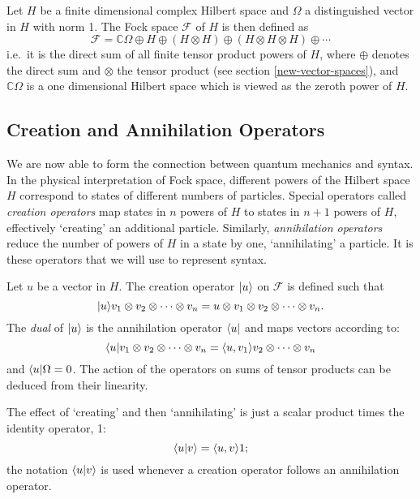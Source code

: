 \documentclass[12pt]{report}
\begin{document}

Let $H$ be a finite dimensional complex Hilbert space and $\Omega$ a distinguished vector in $H$ with norm 1. The Fock space $\mathcal{F}$ of $H$ is then defined as
$$\mathcal{F} = \mathbb{C}\Omega \oplus H \oplus (H \otimes H) \oplus (H \otimes H \otimes H) \oplus \cdots$$
i.e.~it is the direct sum of all finite tensor product powers of $H$, where $\oplus$ denotes the direct sum and $\otimes$ the tensor product (see section \ref{new-vector-spaces}), and $\mathbb{C}\Omega$ is a one dimensional Hilbert space which is viewed as the zeroth power of $H$.





\subsection{Creation and Annihilation Operators}

We are now able to form the connection between quantum mechanics and syntax.
In the physical interpretation of Fock space, different powers of the Hilbert space $H$ correspond to states of different numbers of particles. Special operators called \emph{creation operators} map states in $n$ powers of $H$ to states in $n+1$ powers of $H$, effectively `creating' an additional particle. Similarly, \emph{annihilation operators} reduce the number of powers of $H$ in a state by one, `annihilating' a particle. It is these operators that we will use to represent syntax.

Let $u$ be a vector in $H$. The creation operator $|u \rangle$ on $\mathcal{F}$ is defined such that
$$|u \rangle v_1\otimes v_2 \otimes \cdots \otimes v_n = u \otimes v_1\otimes v_2 \otimes \cdots \otimes v_n.$$
The \emph{dual} of $|u \rangle$ is the annihilation operator $\langle u|$ and maps vectors according to:
$$\langle u|v_1\otimes v_2 \otimes \cdots \otimes v_n = \langle u, v_1 \rangle v_2 \otimes \cdots \otimes v_n$$
and $\langle u|\Omega = 0$. The action of the operators on sums of tensor products can be deduced from their linearity.

The effect of `creating' and then `annihilating' is just a scalar product times the identity operator, 1:
$$\langle u| v\rangle = \langle u, v \rangle1;$$
the notation $\langle u| v\rangle$ is used whenever a creation operator follows an annihilation operator.
\end{document}
